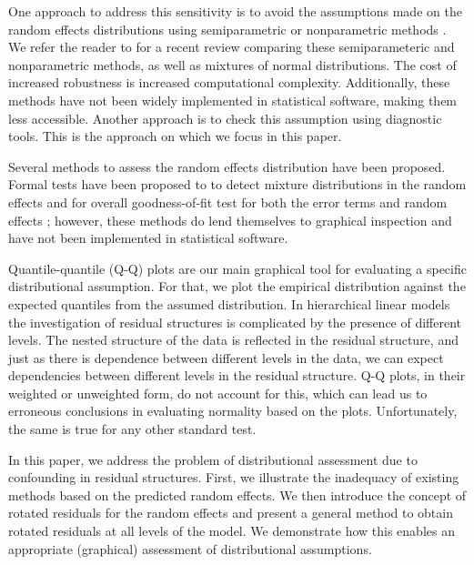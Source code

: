 \documentclass[12pt]{article} %
\newcommand{\hh}[1]{{\color{orange} #1}}
\newcommand{\al}[1]{{\color{red} #1}}
\begin{document}
One approach to address this sensitivity is to avoid the assumptions made on the random effects distributions using semiparametric or nonparametric methods \citep{Shen:1999gd, Zhang:2001wo, Ghidey:2004id}. We refer the reader to \cite{Ghidey:2010de} for a recent review comparing these semiparameteric and nonparametric methods, as well as mixtures of normal distributions. The cost of increased robustness is increased computational complexity. Additionally, these methods have not been widely implemented in statistical software, making them less accessible. Another approach is to check this assumption using diagnostic tools. This is the approach on which we focus in this paper.

Several methods to assess the random effects distribution have been proposed. Formal tests have been proposed to to detect mixture distributions \citep{Verbeke:1996va} in the random effects and for overall goodness-of-fit test for both the error terms and random effects \citep{Jiang:2001up}; however, these methods do lend themselves to graphical inspection and have not been implemented in statistical software.

Quantile-quantile (Q-Q) plots \citep{Wilk:1968} are our main graphical tool for evaluating a specific distributional assumption. For that, we plot the empirical distribution against the expected quantiles from the assumed distribution. In hierarchical linear models the investigation of residual structures is complicated by the presence of  different levels. 
The nested structure of the data is reflected in the residual structure, and just as there is dependence between different levels in the data, we can expect dependencies between different levels in the residual structure. Q-Q plots, {in their} weighted \citep{Dempster:1985tr, Lange:1989uu} or unweighted {form}, do not account for this, which can lead us to erroneous conclusions in evaluating normality based on the plots. \hh{Unfortunately, the same is true for any other standard test. } %



In this paper, we address the problem of distributional assessment due to confounding in residual structures. 
First, we illustrate the inadequacy of existing methods based on the predicted random effects. 
We then introduce  the concept of \al{rotated} residuals for the random effects and present a general method to obtain \al{rotated} residuals at all levels of the model. We demonstrate how this enables an appropriate (graphical) assessment  of distributional assumptions.
\end{document}
